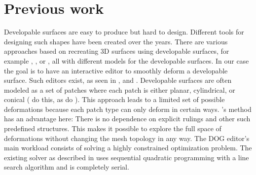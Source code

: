 \documentclass[a4paper,twoside,12pt,nochapterprefix]{scrbook}
\begin{document}

\section{Previous work}\label{sec:prev_work}
Developable surfaces are easy to produce but hard to design. Different tools for designing such shapes have been created over the years. There are various approaches based on recreating 3D surfaces using developable surfaces, for example \cite{liu_et_al}, \cite{kilian-2008-cf}, or \cite{Stein:2018:DSF}, all with different models for the developable surfaces. In our case the goal is to have an interactive editor to smoothly deform a developable surface. Such editors exist, as seen in \cite{bo_et_al}, \cite{tang_et_al} and \cite{Rabinovich:DogNets:2018}. Developable surfaces are often modeled as a set of patches where each patch is either planar, cylindrical, or conical (\cite{bo_et_al} do this, as do \cite{kilian-2008-cf}). This approach leads to a limited set of possible deformations because each patch type can only deform in certain ways. \cite{Rabinovich:DogNets:2018}'s method has an advantage here: There is no dependence on explicit rulings and other such predefined structures. This makes it possible to explore the full space of deformations without changing the mesh topology in any way.\newline
The DOG editor's main workload consists of solving a highly constrained optimization problem. The existing solver as described in \cite{Rabinovich:CurvedFolds:2019} uses sequential quadratic programming with a line search algorithm and is completely serial.\newline
\end{document}
